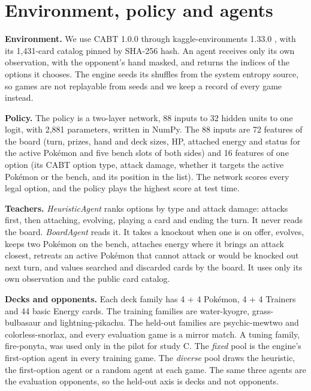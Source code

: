 \documentclass[conference]{IEEEtran}
\begin{document}
\section{Environment, policy and agents}

\textbf{Environment.} We use CABT 1.0.0 through kaggle-environments 1.33.0 \cite{cabt,kaggleenv}, with its 1,431-card catalog pinned by SHA-256 hash. An agent receives only its own observation, with the opponent's hand masked, and returns the indices of the options it chooses. The engine seeds its shuffles from the system entropy source, so games are not replayable from seeds and we keep a record of every game instead.

\textbf{Policy.} The policy is a two-layer network, 88 inputs to 32 hidden units to one logit, with 2,881 parameters, written in NumPy. The 88 inputs are 72 features of the board (turn, prizes, hand and deck sizes, HP, attached energy and status for the active Pok\'emon and five bench slots of both sides) and 16 features of one option (its CABT option type, attack damage, whether it targets the active Pok\'emon or the bench, and its position in the list). The network scores every legal option, and the policy plays the highest score at test time.

\textbf{Teachers.} \emph{HeuristicAgent} ranks options by type and attack damage: attacks first, then attaching, evolving, playing a card and ending the turn. It never reads the board. \emph{BoardAgent} reads it. It takes a knockout when one is on offer, evolves, keeps two Pok\'emon on the bench, attaches energy where it brings an attack closest, retreats an active Pok\'emon that cannot attack or would be knocked out next turn, and values searched and discarded cards by the board. It uses only its own observation and the public card catalog.

\textbf{Decks and opponents.} Each deck family has 4 + 4 Pok\'emon, 4 + 4 Trainers and 44 basic Energy cards. The training families are water-kyogre, grass-bulbasaur and lightning-pikachu. The held-out families are psychic-mewtwo and colorless-snorlax, and every evaluation game is a mirror match. A tuning family, fire-ponyta, was used only in the pilot for study C. The \emph{fixed} pool is the engine's first-option agent in every training game. The \emph{diverse} pool draws the heuristic, the first-option agent or a random agent at each game. The same three agents are the evaluation opponents, so the held-out axis is decks and not opponents.
\end{document}
